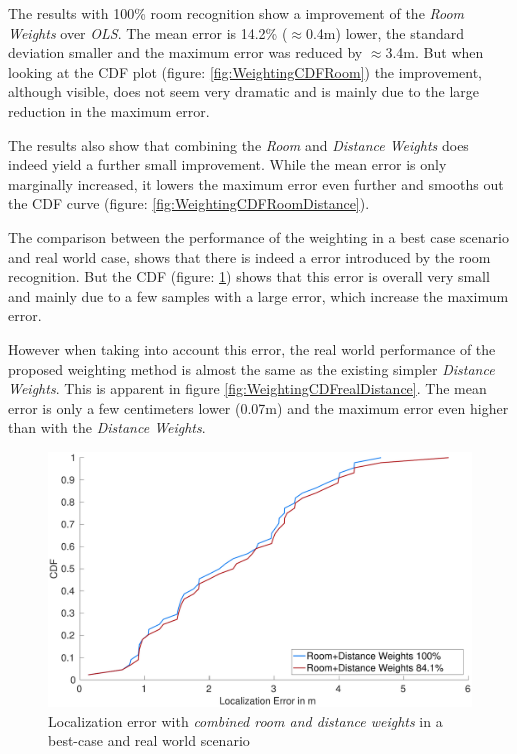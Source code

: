 The results with 100\% room recognition show a improvement of the \emph{Room Weights} over \emph{OLS}. The mean error is 14.2\% ($\approx$0.4m) lower, the standard deviation smaller and the maximum error was reduced by $\approx$3.4m. But when looking at the CDF plot (figure: \ref{fig:WeightingCDFRoom}) the improvement, although visible, does not seem very dramatic and is mainly due to the large reduction in the maximum error.

The results also show that combining the \emph{Room} and \emph{Distance Weights} does indeed yield a further small improvement. While the mean error is only marginally increased, it lowers the maximum error even further and smooths out the CDF curve (figure: \ref{fig:WeightingCDFRoomDistance}).

The comparison between the performance of the weighting in a best case scenario and real world case, shows that there is indeed a error introduced by the room recognition. But the CDF (figure: \ref{fig:WeightingCDFrealRoom}) shows that this error is overall very small and mainly due to a few samples with a large error, which increase the maximum error.

However when taking into account this error, the real world performance of the proposed weighting method is almost the same as the existing simpler \emph{Distance Weights}. This is apparent in figure \ref{fig:WeightingCDFrealDistance}. The mean error is only a few centimeters lower (0.07m) and the maximum error even higher than with the \emph{Distance Weights}.

\begin{figure}[bh]
\centering
\includegraphics[width=\textwidth]{Figures/WeightingCDF_realRW}
\decoRule
\caption[CDF Room+Distance Weights - best-case/real world comparison]{Localization error with \emph{combined room and distance weights} in a best-case and real world scenario}
\label{fig:WeightingCDFrealRoom}
\end{figure}

